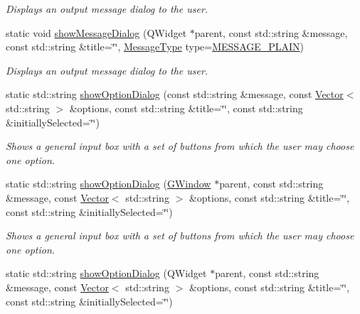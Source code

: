 \begin{DoxyCompactItemize}
\begin{DoxyCompactList}\small\item\em Displays an output message dialog to the user. \end{DoxyCompactList}\item 
static void \mbox{\hyperlink{classGOptionPane_a2284af6ada78d0ddedfc5c2eaeea2d9b}{show\+Message\+Dialog}} (Q\+Widget $\ast$parent, const std\+::string \&message, const std\+::string \&title=\char`\"{}\char`\"{}, \mbox{\hyperlink{classGOptionPane_ac6606ebe91c8ac66a2c314c79f5ab013}{Message\+Type}} type=\mbox{\hyperlink{classGOptionPane_ac6606ebe91c8ac66a2c314c79f5ab013ac03a17c74c589b004d166532958a6196}{M\+E\+S\+S\+A\+G\+E\+\_\+\+P\+L\+A\+IN}})
\begin{DoxyCompactList}\small\item\em Displays an output message dialog to the user. \end{DoxyCompactList}\item 
static std\+::string \mbox{\hyperlink{classGOptionPane_ab97ebcd9d5b5827fbb9292b7c045c72f}{show\+Option\+Dialog}} (const std\+::string \&message, const \mbox{\hyperlink{classVector}{Vector}}$<$ std\+::string $>$ \&options, const std\+::string \&title=\char`\"{}\char`\"{}, const std\+::string \&initially\+Selected=\char`\"{}\char`\"{})
\begin{DoxyCompactList}\small\item\em Shows a general input box with a set of buttons from which the user may choose one option. \end{DoxyCompactList}\item 
static std\+::string \mbox{\hyperlink{classGOptionPane_a611d2c1c7209b39b3c74d9039c28821c}{show\+Option\+Dialog}} (\mbox{\hyperlink{classGWindow}{G\+Window}} $\ast$parent, const std\+::string \&message, const \mbox{\hyperlink{classVector}{Vector}}$<$ std\+::string $>$ \&options, const std\+::string \&title=\char`\"{}\char`\"{}, const std\+::string \&initially\+Selected=\char`\"{}\char`\"{})
\begin{DoxyCompactList}\small\item\em Shows a general input box with a set of buttons from which the user may choose one option. \end{DoxyCompactList}\item 
static std\+::string \mbox{\hyperlink{classGOptionPane_ae710ab30d0f4995523abed1180559d35}{show\+Option\+Dialog}} (Q\+Widget $\ast$parent, const std\+::string \&message, const \mbox{\hyperlink{classVector}{Vector}}$<$ std\+::string $>$ \&options, const std\+::string \&title=\char`\"{}\char`\"{}, const std\+::string \&initially\+Selected=\char`\"{}\char`\"{})

\end{DoxyCompactItemize}
